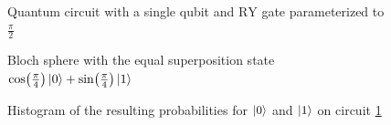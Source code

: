 \begin{figure}[!h]
    \centering
    \caption{Quantum circuit with a single qubit and $\mathrm{RY}$ gate parameterized to $\frac{\pi}{2}$}
    \label{fig:circuit_ry}
\end{figure}

\begin{figure}[!h]
    \centering
    \caption{Bloch sphere with the equal superposition state $\cos(\frac\pi{4})\ket{0} + \sin(\frac\pi{4})\ket{1}$}
    \label{fig:ry_bloch_sphere}
\end{figure}

\begin{figure}[!h]
    \centering
    \caption{Histogram of the resulting probabilities for $\ket{0}$ and $\ket{1}$ on circuit \ref{fig:circuit_ry}}
    \label{fig:histogram_ry}
\end{figure}

